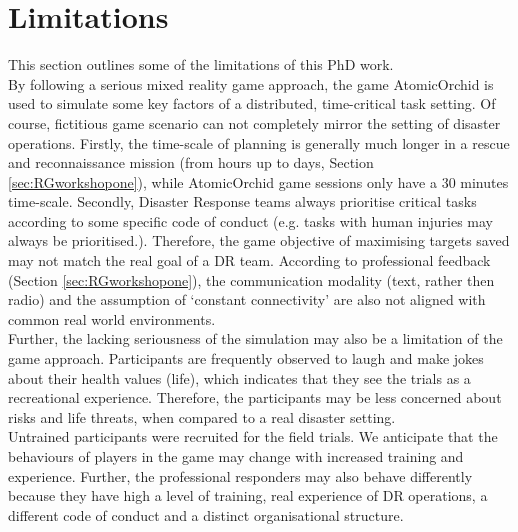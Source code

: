 
\section{Limitations}
This section outlines some of the limitations of this PhD work. \\

By following a serious mixed reality game approach, the game AtomicOrchid is used to simulate some key factors of a distributed, time-critical task setting.  Of course, fictitious game scenario can not completely mirror the setting of disaster operations. Firstly, the time-scale of planning is generally much longer in a rescue and reconnaissance mission (from hours up to days, Section \ref{sec:RGworkshopone}), while AtomicOrchid game sessions only have a 30 minutes time-scale. Secondly, Disaster Response teams always prioritise critical tasks according to some specific code of conduct (e.g. tasks with human injuries may always be prioritised.). Therefore, the game objective of maximising targets saved may not match the real goal of a \ac{DR} team. According to professional feedback (Section \ref{sec:RGworkshopone}), the communication modality (text, rather then radio) and the assumption of `constant connectivity' are also not aligned with common real world environments. \\

Further, the lacking seriousness of the simulation may also be a limitation of the game approach. Participants are frequently observed to laugh and make jokes about their health values (life), which indicates that they see the trials as a recreational experience. Therefore, the participants may be less concerned about risks and life threats, when compared to a real disaster setting. \\

Untrained participants were recruited for the field trials. We anticipate that the behaviours of players in the game may change with increased training and experience. Further, the professional responders may also behave differently because they have high a level of training, real experience of \ac{DR} operations, a different code of conduct and a distinct organisational structure.\\

